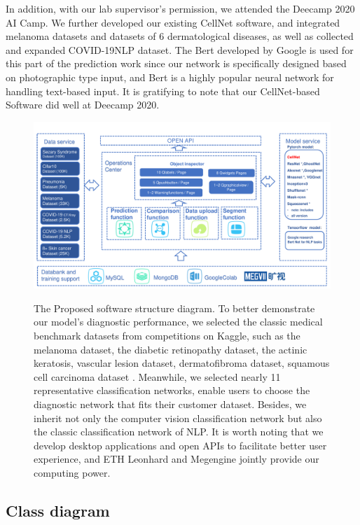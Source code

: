 In addition, with our lab supervisor's permission, we attended the Deecamp 2020 AI Camp. We further developed our existing CellNet software, and integrated melanoma datasets \cite{melanoma} and datasets of 6 dermatological diseases, as well as collected and expanded COVID-19NLP dataset. The Bert \cite{bert} developed by Google is used for this part of the prediction work since our network is specifically designed based on photographic type input, and Bert is a highly popular neural network for handling text-based input. It is gratifying to note that our CellNet-based Software did well at  Deecamp 2020.
\begin{figure}[t]
\begin{center}
\includegraphics[height=0.35\textheight]{thesis-template-master/images/2020DeeCamp_ppt_tcy (1).pdf}
\label{fig:cellnet}
\end{center}
\caption{ The Proposed software structure diagram.
To better demonstrate our model's diagnostic performance, we selected the classic medical benchmark datasets from competitions on Kaggle, such as the melanoma dataset, the diabetic retinopathy dataset, the actinic keratosis, vascular lesion dataset, dermatofibroma dataset, squamous cell carcinoma dataset \cite{ISIC2}\cite{melanoma}. Meanwhile, we selected nearly 11  representative classification networks, enable users to choose the diagnostic network that fits their customer dataset. Besides, we inherit not only the computer vision classification network but also the classic classification network of NLP. It is worth noting that we develop desktop applications and open APIs to facilitate better user experience, and ETH Leonhard and Megengine jointly provide our computing power.}
\label{fig:6.6}
\end{figure}

\subsection{Class diagram} %
\label{sub:amet}

